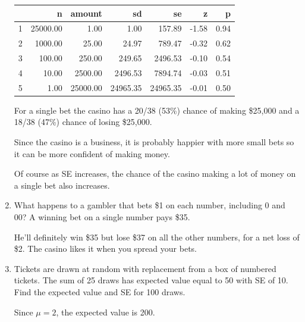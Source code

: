 \documentclass[portrait]{exam}
\begin{document}
\begin{enumerate}
\begin{solution}
        \begin{table}[H]
        \centering
          \begin{tabular}{rrrrrrr}
            \toprule
               & n        & amount   & sd       & se       & z     & p \\
            \midrule
            1  & 25000.00 & 1.00     & 1.00     & 157.89   & -1.58 & 0.94 \\
            2  & 1000.00  & 25.00    & 24.97    & 789.47   & -0.32 & 0.62 \\
            3  & 100.00   & 250.00   & 249.65   & 2496.53  & -0.10 & 0.54 \\
            4  & 10.00    & 2500.00  & 2496.53  & 7894.74  & -0.03 & 0.51 \\
            5  & 1.00     & 25000.00 & 24965.35 & 24965.35 & -0.01 & 0.50 \\
            \bottomrule
          \end{tabular}
        \end{table}

        For a single bet the casino has a 20/38 (53\%) chance of making \$25,000
        and a 18/38 (47\%) chance of losing \$25,000.

        Since the casino is a business, it is probably happier with more small
        bets so it can be more confident of making money.

        Of course as SE increases, the chance of the casino making a lot of
        money on a single bet also increases.
        
      \end{solution}

    \item What happens to a gambler that bets \$1 on each number, including 0
      and 00? A winning bet on a single number pays \$35.

      \begin{solution}
        He'll definitely win \$35 but lose \$37 on all the other numbers, for a
        net loss of \$2. The casino likes it when you spread your bets.
      \end{solution}

    \item Tickets are drawn at random with replacement from a box of numbered
      tickets. The sum of 25 draws has expected value equal to 50 with SE of 10.
      Find the expected value and SE for 100 draws.

      \begin{solution}
        Since $\mu = 2$, the expected value is 200.


\end{solution}
\end{enumerate}
\end{document}

